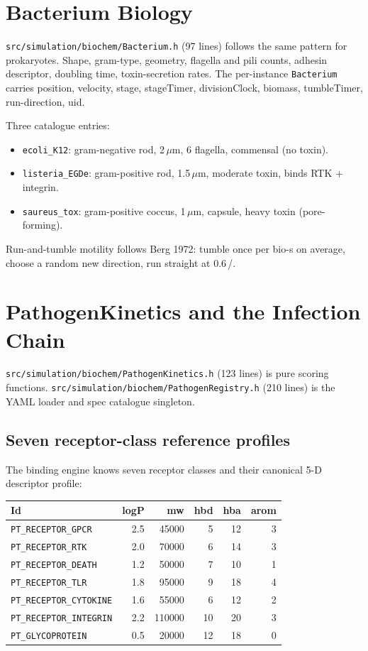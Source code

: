 \documentclass[11pt,letterpaper,twoside,openany]{book}
\newcommand{\code}[1]{\texttt{#1}}
\newcommand{\file}[1]{\texttt{\small#1}}
\newcommand{\biosec}{\text{bio-s}}
\newcommand{\wu}{\text{wu}}
\newcommand{\um}{\ensuremath{\mu\text{m}}}
\begin{document}
\chapter{Bacterium Biology}
\label{ch:bacterium}

\file{src/simulation/biochem/Bacterium.h} (97 lines) follows the same
pattern for prokaryotes. Shape, gram-type, geometry, flagella and
pili counts, adhesin descriptor, doubling time, toxin-secretion
rates. The per-instance \code{Bacterium} carries position, velocity,
stage, stageTimer, divisionClock, biomass, tumbleTimer,
run-direction, uid.

Three catalogue entries:
\begin{itemize}
  \item \texttt{ecoli\_K12}: gram-negative rod, 2\,\um, 6 flagella,
    commensal (no toxin).
  \item \texttt{listeria\_EGDe}: gram-positive rod, 1.5\,\um,
    moderate toxin, binds RTK + integrin.
  \item \texttt{saureus\_tox}: gram-positive coccus, 1\,\um,
    capsule, heavy toxin (pore-forming).
\end{itemize}

Run-and-tumble motility follows Berg 1972: tumble once per bio-s on
average, choose a random new direction, run straight at
0.6\,\wu/\biosec.

\chapter{PathogenKinetics and the Infection Chain}
\label{ch:pathkinetics}

\file{src/simulation/biochem/PathogenKinetics.h} (123 lines) is pure
scoring functions. \file{src/simulation/biochem/PathogenRegistry.h}
(210 lines) is the YAML loader and spec catalogue singleton.

\section{Seven receptor-class reference profiles}

The binding engine knows seven receptor classes and their
canonical 5-D descriptor profile:

\begin{center}
\begin{tabular}{lrrrrr}
\toprule
Id & logP & mw & hbd & hba & arom\\ \midrule
\code{PT\_RECEPTOR\_GPCR}     & 2.5 & 45000 & 5 & 12 & 3\\
\code{PT\_RECEPTOR\_RTK}      & 2.0 & 70000 & 6 & 14 & 3\\
\code{PT\_RECEPTOR\_DEATH}    & 1.2 & 50000 & 7 & 10 & 1\\
\code{PT\_RECEPTOR\_TLR}      & 1.8 & 95000 & 9 & 18 & 4\\
\code{PT\_RECEPTOR\_CYTOKINE} & 1.6 & 55000 & 6 & 12 & 2\\
\code{PT\_RECEPTOR\_INTEGRIN} & 2.2 &110000 & 10& 20 & 3\\
\code{PT\_GLYCOPROTEIN}       & 0.5 & 20000 & 12& 18 & 0\\
\bottomrule
\end{tabular}
\end{center}
\end{document}
